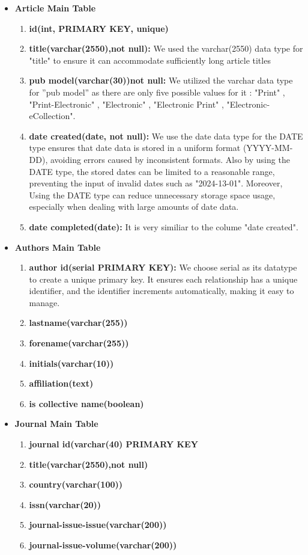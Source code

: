\documentclass{article}
\begin{document}
\begin{itemize}
\item \textbf{Article Main Table}
\begin{enumerate}
\item \textbf{id(int, PRIMARY KEY, unique)}
\item \textbf{title(varchar(2550),not null):} We used the varchar(2550) data type for "title" to ensure it can accommodate sufficiently long article titles
\item \textbf{pub model(varchar(30))not null:} We utilized the varchar data type for ”pub model” as there are only five possible values for it : "Print" , "Print-Electronic" , "Electronic" , "Electronic Print" , "Electronic-eCollection".
\item \textbf{date created(date, not null):} We use the date data type for the DATE type ensures that date data is stored in a uniform format (YYYY-MM-DD), avoiding errors caused by inconsistent formats. Also by using the DATE type, the stored dates can be limited to a reasonable range, preventing the input of invalid dates such as "2024-13-01". Moreover, Using the DATE type can reduce unnecessary storage space usage, especially when dealing with large amounts of date data.
\item \textbf{date completed(date):} It is very similiar to the colume "date created".

\end{enumerate}

\item \textbf{Authors Main Table}
\begin{enumerate}
\item \textbf{author id(serial PRIMARY KEY):} We choose serial as its datatype to create a unique primary key. It ensures each relationship
has a unique identifier, and the identifier increments automatically, making it easy to manage.
\item \textbf{lastname(varchar(255))}
\item \textbf{forename(varchar(255))}
\item \textbf{initials(varchar(10))}
\item\textbf{affiliation(text)}
\item \textbf{is collective name(boolean)}  
\end{enumerate}


\item \textbf{Journal Main Table}
\begin{enumerate}
\item \textbf{journal id(varchar(40) PRIMARY KEY}
\item \textbf{title(varchar(2550),not null)}
\item \textbf{country(varchar(100))}
\item \textbf{issn(varchar(20))}
\item \textbf{journal-issue-issue(varchar(200))}
\item \textbf{journal-issue-volume(varchar(200))}
\end{enumerate}



\end{itemize}
\end{document}
